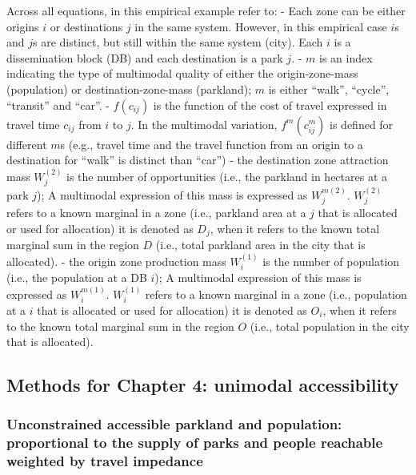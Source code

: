 \documentclass[
11pt, %
oneside, %
english, %
singlespacing, %
]{macthesis} %
\begin{document}
Across all equations, in this empirical example refer to:
- Each zone can be either origins \(i\) or destinations \(j\) in the same system. However, in this empirical case \(i\)s and \(j\)s are distinct, but still within the same system (city). Each \(i\) is a dissemination block (DB) and each destination is a park \(j\).
- \(m\) is an index indicating the type of multimodal quality of either the origin-zone-mass (population) or destination-zone-mass (parkland); \(m\) is either ``walk'', ``cycle'', ``transit'' and ``car''.
- \(f(c_{ij})\) is the function of the cost of travel expressed in travel time \(c_{ij}\) from \(i\) to \(j\). In the multimodal variation, \(f^m(c^m_{ij})\) is defined for different \(m\)s (e.g., travel time and the travel function from an origin to a destination for ``walk'' is distinct than ``car'')
- the destination zone attraction mass \(W_j^{(2)}\) is the number of opportunities (i.e., the parkland in hectares at a park \(j\)); A multimodal expression of this mass is expressed as \(W_j^{m(2)}\). \(W_j^{(2)}\) refers to a known marginal in a zone (i.e., parkland area at a \(j\) that is allocated or used for allocation) it is denoted as \(D_j\), when it refers to the known total marginal sum in the region \(D\) (i.e., total parkland area in the city that is allocated).
- the origin zone production mass \(W_i^{(1)}\) is the number of population (i.e., the population at a DB \(i\)); A multimodal expression of this mass is expressed as \(W_i^{m(1)}\). \(W_i^{(1)}\) refers to a known marginal in a zone (i.e., population at a \(i\) that is allocated or used for allocation) it is denoted as \(O_i\), when it refers to the known total marginal sum in the region \(O\) (i.e., total population in the city that is allocated).

\subsection{Methods for Chapter 4: unimodal accessibility}\label{methods-for-chapter-4-unimodal-accessibility}

\subsubsection{Unconstrained accessible parkland and population: proportional to the supply of parks and people reachable weighted by travel impedance}\label{unconstrained-accessible-parkland-and-population-proportional-to-the-supply-of-parks-and-people-reachable-weighted-by-travel-impedance}
\end{document}
